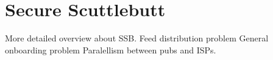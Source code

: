 \chapter{Secure Scuttlebutt}
More detailed overview about SSB.
Feed distribution problem
General onboarding problem
Paralellism between pubs and ISPs.
